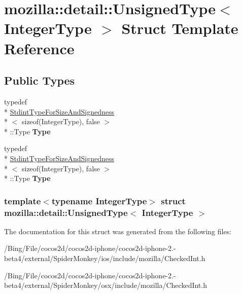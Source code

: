 \hypertarget{structmozilla_1_1detail_1_1_unsigned_type}{\section{mozilla\-:\-:detail\-:\-:Unsigned\-Type$<$ Integer\-Type $>$ Struct Template Reference}
\label{structmozilla_1_1detail_1_1_unsigned_type}
}
\subsection*{Public Types}
\begin{DoxyCompactItemize}
\item 
\hypertarget{structmozilla_1_1detail_1_1_unsigned_type_a2c21d88c22cffae34f92475861d2810c}{typedef \\*
\hyperlink{structmozilla_1_1detail_1_1_stdint_type_for_size_and_signedness}{Stdint\-Type\-For\-Size\-And\-Signedness}\\*
$<$ sizeof(Integer\-Type), false $>$\\*
\-::Type {\bfseries Type}}\label{structmozilla_1_1detail_1_1_unsigned_type_a2c21d88c22cffae34f92475861d2810c}

\item 
\hypertarget{structmozilla_1_1detail_1_1_unsigned_type_a2c21d88c22cffae34f92475861d2810c}{typedef \\*
\hyperlink{structmozilla_1_1detail_1_1_stdint_type_for_size_and_signedness}{Stdint\-Type\-For\-Size\-And\-Signedness}\\*
$<$ sizeof(Integer\-Type), false $>$\\*
\-::Type {\bfseries Type}}\label{structmozilla_1_1detail_1_1_unsigned_type_a2c21d88c22cffae34f92475861d2810c}

\end{DoxyCompactItemize}
\subsubsection*{template$<$typename Integer\-Type$>$ struct mozilla\-::detail\-::\-Unsigned\-Type$<$ Integer\-Type $>$}



The documentation for this struct was generated from the following files\-:\begin{DoxyCompactItemize}
\item 
/\-Bing/\-File/cocos2d/cocos2d-\/iphone/cocos2d-\/iphone-\/2.-\/beta4/external/\-Spider\-Monkey/ios/include/mozilla/Checked\-Int.\-h\item 
/\-Bing/\-File/cocos2d/cocos2d-\/iphone/cocos2d-\/iphone-\/2.-\/beta4/external/\-Spider\-Monkey/osx/include/mozilla/Checked\-Int.\-h\end{DoxyCompactItemize}
